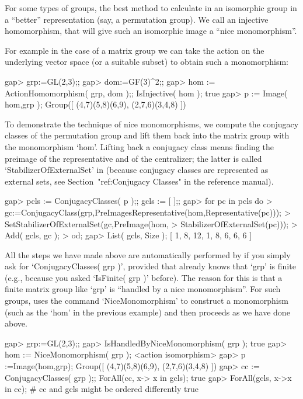 
For some types of groups, the best method to calculate in an isomorphic
group in a ``better'' representation (say, a permutation group).  We call an
injective homomorphism, that will give such an isomorphic image a ``nice
monomorphism''.

For example in the case of a matrix group we can take the action on the
underlying vector space (or a suitable subset) to obtain such a
monomorphism:

\beginexample
gap> grp:=GL(2,3);;
gap> dom:=GF(3)^2;;
gap> hom := ActionHomomorphism( grp, dom );; IsInjective( hom );
true
gap> p := Image( hom,grp );
Group([ (4,7)(5,8)(6,9), (2,7,6)(3,4,8) ])
\endexample

To  demonstrate the technique  of   nice  monomorphisms, we  compute  the
conjugacy classes of the  permutation group and  lift them back into  the
matrix group with the monomorphism `hom'. Lifting  back a conjugacy class
means finding the preimage of  the representative and of the centralizer;
the latter  is   called  `StabilizerOfExternalSet'   in {\GAP}   (because
conjugacy  classes are represented as   external sets, see
Section~"ref:Conjugacy Classes" in the reference manual).

\beginexample
gap> pcls := ConjugacyClasses( p );; gcls := [  ];;
gap> for pc  in pcls  do
>      gc:=ConjugacyClass(grp,PreImagesRepresentative(hom,Representative(pc)));
>      SetStabilizerOfExternalSet(gc,PreImage(hom,
>                                 StabilizerOfExternalSet(pc)));
>      Add( gcls, gc );
>    od;
gap> List( gcls, Size );
[ 1, 8, 12, 1, 8, 6, 6, 6 ]
\endexample

All the steps we have made above are automatically performed by {\GAP} if
you  simply ask for `ConjugacyClasses(   grp   )', provided that   {\GAP}
already knows  that `grp' is finite (e.g.,  because  you asked `IsFinite(
grp  )' before). The reason  for this is that  a  finite matrix group like
`grp' is ``handled by a nice monomorphism''. For such groups, {\GAP} uses
the command `NiceMonomorphism' to construct a monomorphism (such as the
`hom' in the previous example) and then proceeds as we have done above.

\beginexample
gap> grp:=GL(2,3);;
gap> IsHandledByNiceMonomorphism( grp );
true
gap> hom := NiceMonomorphism( grp );
<action isomorphism>
gap> p :=Image(hom,grp);
Group([ (4,7)(5,8)(6,9), (2,7,6)(3,4,8) ])
gap> cc := ConjugacyClasses( grp );; ForAll(cc, x-> x in gcls); 
true
gap> ForAll(gcls, x->x in cc); # cc and gcls might be ordered differently
true
\endexample

